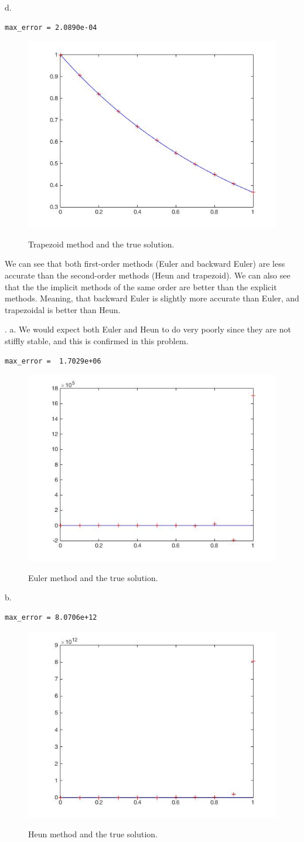 \documentclass[12pt letterpaper]{article}
\begin{document}
\noindent d. 
\begin{verbatim}
max_error = 2.0890e-04
\end{verbatim}
\begin{figure}[H]
  \caption{Trapezoid method and the true solution.}
  \centering
    \includegraphics[width=.5\textwidth]{trapezoid.jpg}
    \label{fig:trapz}
\end{figure}

We can see that both first-order methods (Euler and backward Euler) are less accurate than the second-order methods 
(Heun and trapezoid). We can also see that the the implicit methods of the same order are better than the explicit methods. Meaning, that backward Euler is slightly more accurate than Euler, and trapezoidal is better than Heun. 


. a.
We would expect both Euler and Heun to do very poorly since they are not stiffly stable, and this is confirmed in this problem.  
\begin{verbatim}
max_error =  1.7029e+06
\end{verbatim}
\begin{figure}[H]
  \caption{Euler method and the true solution. }
  \centering
    \includegraphics[width=.5\textwidth]{euler_stiff.jpg}
    \label{fig:Euler_3a}
\end{figure}

\noindent b. 
\begin{verbatim}
max_error = 8.0706e+12
\end{verbatim}
\begin{figure}[H]
  \caption{Heun method and the true solution.}
  \centering
    \includegraphics[width=.5\textwidth]{heuns_stiff.jpg}
    \label{fig:heun_3b}
\end{figure}
\end{document}
